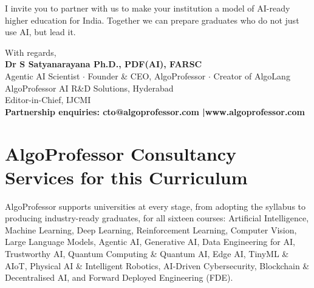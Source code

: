 \documentclass[10pt,a4paper]{article}
\begin{document}
I invite you to partner with us to make your institution a model of AI-ready higher education for India. Together we can prepare graduates who do not just use AI, but lead it.

With regards,\\[2pt]
{\bfseries\color{navy}Dr S Satyanarayana Ph.D., PDF(AI), FARSC}\\
{\small Agentic AI Scientist $\cdot$ Founder \& CEO, AlgoProfessor $\cdot$ Creator of AlgoLang\\AlgoProfessor AI R\&D Solutions, Hyderabad\\Editor-in-Chief, IJCMI\\
{\color{gold}\bfseries Partnership enquiries: cto@algoprofessor.com \quad|\quad www.algoprofessor.com}}
\newpage

\section*{AlgoProfessor Consultancy Services for this Curriculum}
AlgoProfessor supports universities at every stage, from adopting the syllabus to producing industry-ready graduates, for all sixteen courses: Artificial Intelligence, Machine Learning, Deep Learning, Reinforcement Learning, Computer Vision, Large Language Models, Agentic AI, Generative AI, Data Engineering for AI, Trustworthy AI, Quantum Computing \& Quantum AI, Edge AI, TinyML \& AIoT, Physical AI \& Intelligent Robotics, AI-Driven Cybersecurity, Blockchain \& Decentralised AI, and Forward Deployed Engineering (FDE).
\end{document}
